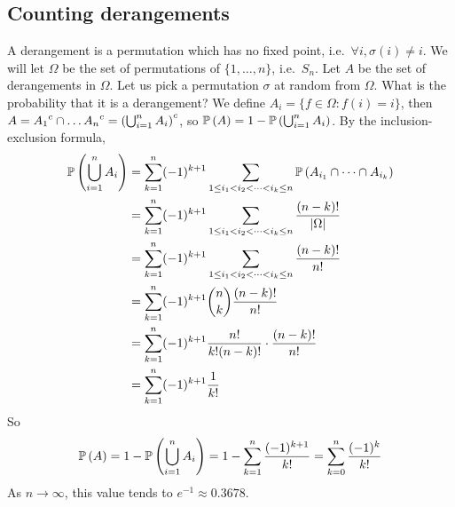 \subsection{Counting derangements}
A derangement is a permutation which has no fixed point, i.e.\ \(\forall i, \sigma(i) \neq i\).
We will let \(\Omega\) be the set of permutations of \(\{1, \dots, n\}\), i.e.\ \(S_n\).
Let \(A\) be the set of derangements in \(\Omega\).
Let us pick a permutation \(\sigma\) at random from \(\Omega\).
What is the probability that it is a derangement?
We define \(A_i = \{ f \in \Omega \colon f(i) = i \}\), then \(A = {A_1}^c \cap \dots {A_n}^c = {\left( \bigcup_{i=1}^n A_i  \right)}^c\), so \(\mathbb{P}\left({A}\right) = 1 - \mathbb{P}\left({\bigcup_{i=1}^n A_i}\right)\).
By the inclusion-exclusion formula,
\begin{align*}
	\mathbb{P}\left({\bigcup_{i=1}^n A_i}\right) & = \sum_{k=1}^n (-1)^{k+1} \sum_{1 \leq i_1 < i_2 < \dots < i_k \leq n} \mathbb{P}\left({A_{i_1} \cap \dots \cap A_{i_k}}\right) \\
	                           & = \sum_{k=1}^n (-1)^{k+1} \sum_{1 \leq i_1 < i_2 < \dots < i_k \leq n} \frac{(n-k)!}{\abs{\Omega}}            \\
	                           & = \sum_{k=1}^n (-1)^{k+1} \sum_{1 \leq i_1 < i_2 < \dots < i_k \leq n} \frac{(n-k)!}{n!}                      \\
	                           & = \sum_{k=1}^n (-1)^{k+1} \binom{n}{k} \frac{(n-k)!}{n!}                                                      \\
	                           & = \sum_{k=1}^n (-1)^{k+1} \frac{n!}{k!(n-k)!} \cdot \frac{(n-k)!}{n!}                                         \\
	                           & = \sum_{k=1}^n (-1)^{k+1} \frac{1}{k!}                                                                        \\
\end{align*}
So
\[
	\mathbb{P}\left({A}\right) = 1 - \mathbb{P}\left({\bigcup_{i=1}^n A_i}\right) = 1 - \sum_{k=1}^n \frac{(-1)^{k+1}}{k!} = \sum_{k=0}^n \frac{(-1)^k}{k!}
\]
As \(n \to \infty\), this value tends to \(e^{-1} \approx 0.3678\).

